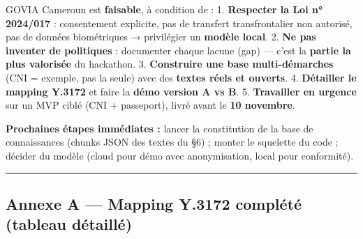 \documentclass[
]{article}
\begin{document}
GOVIA Cameroun est \textbf{faisable}, à condition de : 1.
\textbf{Respecter la Loi n° 2024/017} : consentement explicite, pas de
transfert transfrontalier non autorisé, pas de données biométriques →
privilégier un \textbf{modèle local}. 2. \textbf{Ne pas inventer de
politiques} : documenter chaque lacune (gap) --- c'est la \textbf{partie
la plus valorisée} du hackathon. 3. \textbf{Construire une base
multi-démarches} (CNI = exemple, pas la seule) avec des \textbf{textes
réels et ouverts}. 4. \textbf{Détailler le mapping Y.3172} et faire la
\textbf{démo version A vs B}. 5. \textbf{Travailler en urgence} sur un
MVP ciblé (CNI + passeport), livré avant le \textbf{10 novembre}.

\textbf{Prochaines étapes immédiates :} lancer la constitution de la
base de connaissances (chunks JSON des textes du §6) ; monter le
squelette du code ; décider du modèle (cloud pour démo avec
anonymisation, local pour conformité).

\begin{center}\rule{0.5\linewidth}{0.5pt}\end{center}

\subsection{Annexe A --- Mapping Y.3172 complété (tableau
détaillé)}\label{annexe-a-mapping-y.3172-compluxe9tuxe9-tableau-duxe9tailluxe9}
\end{document}
